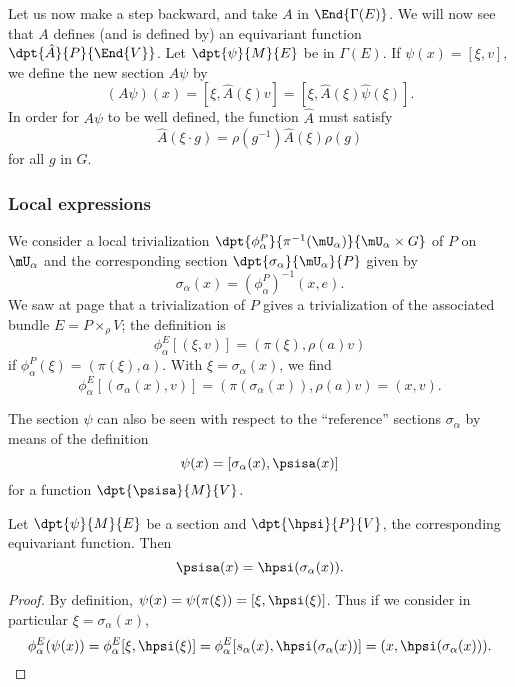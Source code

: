 Let us now make a step backward, and take $A$ in $\End{\Gamma(E)}$. We will now see that $A$ defines (and is defined by) an equivariant function $\dpt{\hat A}{P}{\End{V}}$. Let $\dpt{\psi}{M}{E}$ be in $\Gamma(E)$. If $\psi(x)=[\xi,v]$, we define the new section $A\psi$ by
\[
	(A\psi)(x)=[\xi,\hat A(\xi)v]=[\xi,\hat A(\xi)\hat\psi(\xi)].
\]
In order for $A\psi$ to be well defined, the function $\hat A$ must satisfy
\begin{equation}
	\hat A(\xi\cdot g)=\rho(g^{-1})\hat A(\xi)\rho(g)                 \label{equivA}
\end{equation}
for all $g$ in $G$.

\subsubsection{Local expressions}

We consider a local trivialization $\dpt{\phi^P_{\alpha}}{\pi^{-1}(\mU_{\alpha})}{\mU_{\alpha}\times G}$ of $P$ on $\mU_{\alpha}$ and the corresponding section $\dpt{\sigma_{\alpha}}{\mU_{\alpha}}{P}$ given by
\[
	\sigma_{\alpha}(x)=(\phi^P_{\alpha})^{-1}(x,e).
\]
We saw at page \pageref{eq:triv_P_E} that a trivialization of $P$ gives a trivialization of the associated bundle $E=P\times_{\rho} V$; the definition is
\begin{equation}
	\phi^E_{\alpha}[(\xi,v)]=( \pi(\xi),\rho(a)v )
\end{equation}
if $\phi_{\alpha}^P(\xi)=(\pi(\xi),a)$. With $\xi=\sigma_{\alpha}(x)$, we find
\begin{equation}
	\phi^E_{\alpha}[(\sigma_{\alpha}(x),v)]=(  \pi(\sigma_{\alpha}(x)),\rho(a)v  )
	=(x,v).
\end{equation}

The section $\psi$ can also be seen with respect to the ``reference''{} sections $\sigma_{\alpha}$ by means of the definition
\begin{equation}\label{eq:def:psisa}
	\psi(x)=[\sigma_{\alpha}(x),\psisa(x)]
\end{equation}
for a function $\dpt{\psisa}{M}{V}$.

\begin{lemma}
	Let $\dpt{\psi}{M}{E}$ be a section and $\dpt{\hpsi}{P}{V}$, the corresponding equivariant function. Then
	\[
		\psisa(x)=\hpsi(\sigma_{\alpha}(x)).
	\]
\end{lemma}

\begin{proof}
	By definition, $\psi(x)=\psi(\pi(\xi))=[\xi,\hpsi(\xi)]$.  Thus if we consider in particular $\xi=\sigma_{\alpha}(x)$,
	\begin{equation}
		\phi^E_{\alpha}(\psi(x))=\phi^E_{\alpha}[\xi,\hpsi(\xi)]
		=\phi^E_{\alpha}[s_{\alpha}(x),\hpsi(\sigma_{\alpha}(x))]
		=(x,\hpsi(\sigma_{\alpha}(x))).
	\end{equation}

\end{proof}

